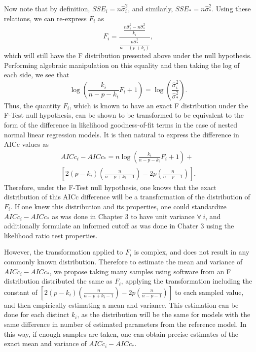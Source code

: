 Now note that by definition, $SSE_i = n \hat{\sigma}^2_i$, and similarly, $SSE_* = n \hat{\sigma}^2_*$. Using these relations, we can re-express
$F_i$ as
\begin{equation*}
	F_i = \frac{\frac{n \hat{\sigma}^2_i - n \hat{\sigma}^2_*}{k_i}}{\frac{n \hat{\sigma}^2_*}{n-(p+k_i)}} ,
\end{equation*}
which will still have the F distribution presented above under the null hypothesis. Performing algebraic manipulation on this equality and
then taking the log of each side, we see that
\begin{equation*}
	\log \left( \frac{k_i}{n-p-k_i} F_i + 1 \right) = \log \left( \frac{\hat{\sigma}^2_i}{\hat{\sigma}^2_*} \right) .
\end{equation*}
Thus, the quantity $F_i$, which is known to have an exact F distribution under the F-Test null hypothesis, can be shown to be transformed to
be equivalent to the form of the difference in likelihood goodness-of-fit terms in the case of nested normal linear regression models.
It is then natural to express the difference in AICc values as
\begin{equation*}
	\begin{split}
	AICc_i - AICc_* = n \log \left( \frac{k_i}{n-p-k_i} F_i + 1 \right) + \\
	\left[ 2(p-k_i) \left( \frac{n}{n-p+k_i-1} \right) - 2p \left( \frac{n}{n-p-1} \right) \right] .
	\end{split}
\end{equation*}
Therefore, under the F-Test null hypothesis, one knows that the exact distribution of this AICc difference will be a transformation of the
distribution of $F_i$. If one knew this distribution and its properties, one could standardize $AICc_i - AICc_*$ as was done in Chapter 3
to have unit variance $\forall\: i$, and additionally formulate an informed cutoff as was done in Chater 3 using the likelihood ratio
test properties.

However, the transformation applied to $F_i$ is complex, and does not result in any commonly known distribution. Therefore to estimate
the mean and variance of $AICc_i - AICc_*$, we propose taking many samples using software from an F distribution distributed the same as $F_i$,
applying the transformation including the constant of $\left[ 2(p-k_i) \left( \frac{n}{n-p+k_i-1} \right) - 2p \left( \frac{n}{n-p-1} \right) \right]$ to each sampled value,
and then empirically estimating a mean and variance. This estimation can be done for each distinct $k_i$, as the distribution will be the same for models with
the same difference in number of estimated parameters from the reference model. In this way, if enough samples are taken, one can obtain precise estimates
of the exact mean and variance of $AICc_i - AICc_*$.

